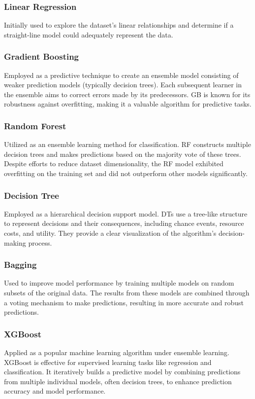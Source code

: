 \documentclass[conference]{IEEEtran}
\begin{document}
    \subsubsection{Linear Regression}
        Initially used to explore the dataset's linear relationships and determine if a straight-line model could adequately represent the data.
    
    \subsubsection{Gradient Boosting}
        Employed as a predictive technique to create an ensemble model consisting of weaker prediction models (typically decision trees). Each subsequent learner in the ensemble aims to correct errors made by its predecessors. GB is known for its robustness against overfitting, making it a valuable algorithm for predictive tasks.
    
    \subsubsection{Random Forest}
        Utilized as an ensemble learning method for classification. RF constructs multiple decision trees and makes predictions based on the majority vote of these trees. Despite efforts to reduce dataset dimensionality, the RF model exhibited overfitting on the training set and did not outperform other models significantly.
    
    \subsubsection{Decision Tree}
        Employed as a hierarchical decision support model. DTs use a tree-like structure to represent decisions and their consequences, including chance events, resource costs, and utility. They provide a clear visualization of the algorithm's decision-making process.
    
    \subsubsection{Bagging}
        Used to improve model performance by training multiple models on random subsets of the original data. The results from these models are combined through a voting mechanism to make predictions, resulting in more accurate and robust predictions.
    
    \subsubsection{XGBoost}
        Applied as a popular machine learning algorithm under ensemble learning. XGBoost is effective for supervised learning tasks like regression and classification. It iteratively builds a predictive model by combining predictions from multiple individual models, often decision trees, to enhance prediction accuracy and model performance.
\end{document}
